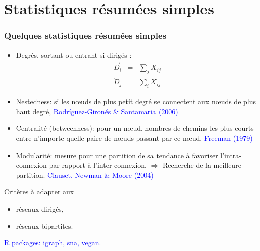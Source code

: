 \documentclass[nopagenumber,9pt]{beamer}
\begin{document}
\section{Statistiques résumées simples}

\begin{frame}
\frametitle{Quelques statistiques résumées simples}


\begin{itemize}

\item Degrés, sortant ou entrant si dirigés :
\begin{eqnarray*}
 \overrightarrow{D}_i&=&\sum_j X_{ij}\\
 \overleftarrow{D}_j&=&\sum_i X_{ij}
\end{eqnarray*}

\item Nestedness: si les n\oe uds de plus petit degré se connectent aux n\oe uds de plus haut degré,
\textcolor{blue}{Rodríguez-Gironés \& Santamaria (2006)}

\item Centralité (betweenness): pour un n\oe ud, nombres de chemins les plus courts entre n'importe quelle paire de n\oe uds passant par ce n\oe ud.
\textcolor{blue}{Freeman (1979)}

\item Modularité: mesure pour une partition de sa tendance à favoriser l'intra-connexion par rapport à l'inter-connexion.
$\Rightarrow$ Recherche de la meilleure partition. 
\textcolor{blue}{Clauset, Newman \& Moore (2004)}
\end{itemize}


\bigskip

Critères à adapter aux
\begin{itemize}
 \item réseaux dirigés,
 \item réseaux bipartites.
\end{itemize}

\bigskip

\textcolor{blue}{R packages: igraph, sna, vegan.} 


\end{frame}
\end{document}
